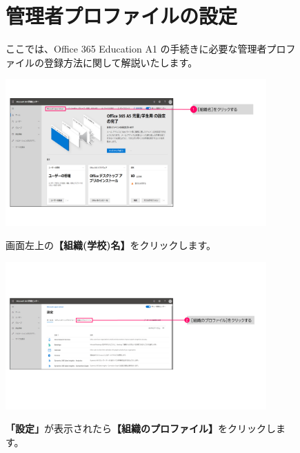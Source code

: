 \begin{figure}[h]
    \begin{minipage}{1.0\textwidth}
        \section{管理者プロファイルの設定}
        ここでは、Office 365 Education A1 の手続きに必要な管理者プロファイルの登録方法に関して解説いたします。
    \end{minipage}
\end{figure}

\begin{figure}[h]
    \begin{minipage}{0.6\textwidth}
        \includegraphics[width=10cm]{figures/O365A1_profile00.png}
    \end{minipage}
    \begin{minipage}{0.4\textwidth}
       画面左上の\textbf{【組織(学校)名】}をクリックします。
    \end{minipage}
\end{figure}

\begin{figure}[h]
    \begin{minipage}{0.6\textwidth}
        \includegraphics[width=10cm]{figures/O365A1_profile01.png}
    \end{minipage}
    \begin{minipage}{0.4\textwidth}
       \textbf{「設定」}が表示されたら\textbf{【組織のプロファイル】}をクリックします。
    \end{minipage}
\end{figure}

